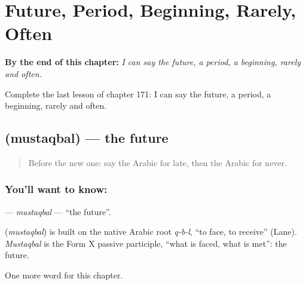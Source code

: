 
\chapter{Future, Period, Beginning, Rarely, Often}
\label{ch:ar-future-period-beginning-rarely-often}

\begin{chapteropening}
\textbf{By the end of this chapter:} \emph{I can say the future, a period, a beginning, rarely and often.}

Complete the last lesson of chapter 171: I can say the future, a period, a beginning, rarely and often.
\end{chapteropening}

\section[\texorpdfstring{\ar{مستقبل} (mustaqbal)}{مستقبل (mustaqbal)}]{ (mustaqbal) — the future}

\label{lesson:AR-C171-mustaqbal}



\begin{quote}
Before the new one: say the Arabic for late, then the Arabic for never.
\end{quote}

\subsection*{You'll want to know: }
\textbf{} — \emph{mustaqbal} — \textquotedblleft{}the future\textquotedblright{}.

\begin{cousinweb}
\textbf{} (\emph{mustaqbal}) is built on the native Arabic root \emph{q-b-l}, \textquotedblleft{}to face, to receive\textquotedblright{} (Lane). \emph{Mustaqbal} is the Form X passive participle, \textquotedblleft{}what is faced, what is met\textquotedblright{}: the future.
\end{cousinweb}

\begin{grammarlens}[title={What you've built}]
One more word for this chapter.
\end{grammarlens}

